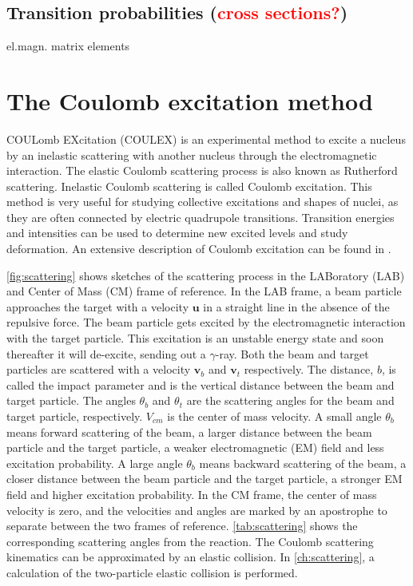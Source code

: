 \documentclass[twoside,english]{uiofysmaster/uiofysmaster}
\newcommand{\ga}{$\gamma$}
\let\orgautoref\autoref
\renewcommand{\autoref}
        {%
		 \def\sectionautorefname{Section}%
		 \def\subsectionautorefname{Section}%
		 \def\subsubsectionautorefname{Section}%
		 \def\chapterautorefname{Chapter}%
          \orgautoref}
\begin{document}
\subsection{Transition probabilities (\textcolor{red}{cross sections?})}

el.magn. matrix elements



\section{The Coulomb excitation method}\label{sec:Coulex}
COULomb EXcitation (COULEX) is an experimental method to excite a nucleus by an inelastic scattering with another nucleus through the electromagnetic interaction. 
The elastic Coulomb scattering process is also known as Rutherford scattering.
Inelastic Coulomb scattering is called Coulomb excitation.
This method is very useful for studying collective excitations and shapes of nuclei, as they are often connected by electric quadrupole transitions.  
Transition energies and intensities can be used to determine new excited levels and study deformation.
An extensive description of Coulomb excitation can be found in \cite{Alder1956, EE-Coulex}.

\autoref{fig:scattering} shows sketches of the scattering process in the LABoratory (LAB) and Center of Mass (CM) frame of reference. 
In the LAB frame, a beam particle approaches the target with a velocity $\mathbf{u}$ in a straight line in the absence of the repulsive force. 
The beam particle gets excited by the electromagnetic interaction with the target particle. 
This excitation is an unstable energy state and soon thereafter it will de-excite, sending out a \ga-ray.
Both the beam and target particles are scattered with a velocity $\mathbf{v}_b$ and $\mathbf{v}_t$ respectively.
The distance, $b$, is called the impact parameter and is the vertical distance between the beam and target particle. 
The angles $\theta_b$ and $\theta_t$ are the scattering angles for the beam and target particle, respectively. 
$V_{cm}$ is the center of mass velocity. 
A small angle $\theta_b$ means forward scattering of the beam, a larger distance between the beam particle and the target particle, a weaker electromagnetic (EM) field and less excitation probability. 
A large angle $\theta_b$ means backward scattering of the beam, a closer distance between the beam particle and the target particle, a stronger EM field and higher excitation probability.
In the CM frame, the center of mass velocity is zero, and the velocities and angles are marked by an apostrophe to separate between the two frames of reference.
\autoref{tab:scattering} shows the corresponding scattering angles from the reaction. 
The Coulomb scattering kinematics can be approximated by an elastic collision.
In \autoref{ch:scattering}, a calculation of the two-particle elastic collision is performed.
\end{document}

